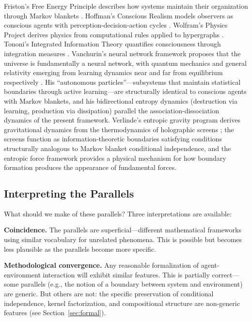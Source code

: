 \documentclass[11pt,a4paper]{article}
\theoremstyle{definition}
\theoremstyle{plain}
\theoremstyle{remark}
\begin{document}
Friston's Free Energy Principle describes how systems maintain their organization through Markov blankets \citep{Friston2010,Friston2019}. Hoffman's Conscious Realism models observers as conscious agents with perception-decision-action cycles \citep{Hoffman2014,Hoffman2019}. Wolfram's Physics Project derives physics from computational rules applied to hypergraphs \citep{Wolfram2020}. Tononi's Integrated Information Theory quantifies consciousness through integration measures \citep{Tononi2015}. Vanchurin's neural network framework proposes that the universe is fundamentally a neural network, with quantum mechanics and general relativity emerging from learning dynamics near and far from equilibrium respectively \citep{Vanchurin2020}. His ``autonomous particles''---subsystems that maintain statistical boundaries through active learning---are structurally identical to conscious agents with Markov blankets, and his bidirectional entropy dynamics (destruction via learning, production via dissipation) parallel the association-dissociation dynamics of the present framework. Verlinde's entropic gravity program derives gravitational dynamics from the thermodynamics of holographic screens \citep{Verlinde2011}; the screens function as information-theoretic boundaries satisfying conditions structurally analogous to Markov blanket conditional independence, and the entropic force framework provides a physical mechanism for how boundary formation produces the appearance of fundamental forces.

\subsection{Interpreting the Parallels}\label{sec:interpreting}

What should we make of these parallels? Three interpretations are available:

\textbf{Coincidence.} The parallels are superficial---different mathematical frameworks using similar vocabulary for unrelated phenomena. This is possible but becomes less plausible as the parallels become more specific.

\textbf{Methodological convergence.} Any reasonable formalization of agent-environment interaction will exhibit similar features. This is partially correct---some parallels (e.g., the notion of a boundary between system and environment) are generic. But others are not: the specific preservation of conditional independence, kernel factorization, and compositional structure are non-generic features (see Section~\ref{sec:formal}).
\end{document}
